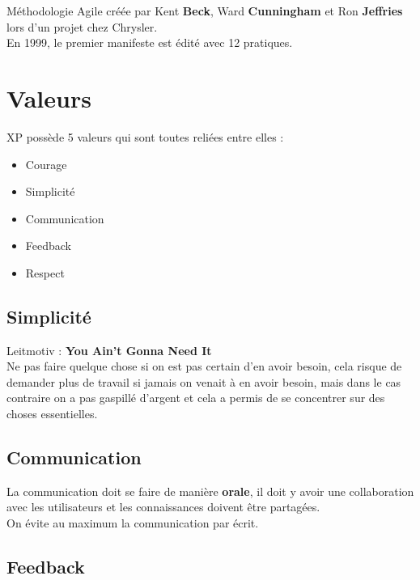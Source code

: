 \documentclass{report}
\begin{document}
		Méthodologie Agile créée par Kent \textbf{Beck}, Ward \textbf{Cunningham} et Ron \textbf{Jeffries} lors d'un projet chez Chrysler.\\

		En 1999, le premier manifeste est édité avec 12 pratiques.\\

	\section{Valeurs}

		XP possède 5 valeurs qui sont toutes reliées entre elles : \\

		\begin{itemize}
			\item Courage
			\item Simplicité
			\item Communication
			\item Feedback
			\item Respect\\
		\end{itemize}

		\subsection{Simplicité}

			Leitmotiv : \textbf{You Ain't Gonna Need It}\\

			Ne pas faire quelque chose si on est pas certain d'en avoir besoin, cela risque de demander plus de travail si jamais on venait à en avoir besoin, mais dans le cas contraire on a pas gaspillé d'argent et cela a permis de se concentrer sur des choses essentielles.\\

		\subsection{Communication}

			La communication doit se faire de manière \textbf{orale}, il doit y avoir une collaboration avec les utilisateurs et les connaissances doivent être partagées.\\

			On évite au maximum la communication par écrit.\\

		\subsection{Feedback}
\end{document}
